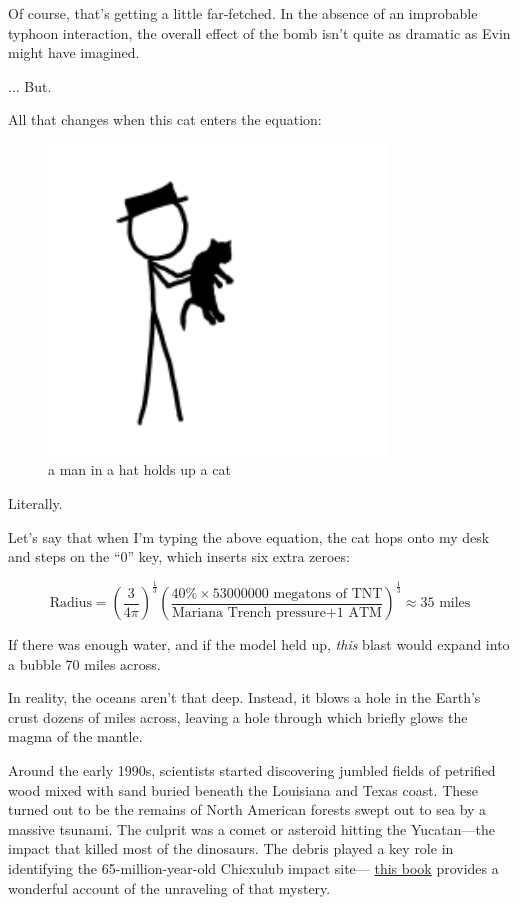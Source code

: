 {Of course, that’s getting a little far-fetched. In the absence of an improbable typhoon interaction, the overall effect of the bomb isn’t quite as dramatic as Evin might have imagined.}

{... But.}

{All that changes when this cat enters the equation:}

\begin{figure}[!htbp]
\centering
\includegraphics[scale=0.5, max width=0.8\textwidth]{imgs/a/15/mariana_cat.png}
\caption{a man in a hat holds up a cat}
\end{figure}

{Literally.}

{Let’s say that when I’m typing the above equation, the cat hops onto my desk and steps on the “0” key, which inserts six extra zeroes:}

{\[\text{Radius} =\left (\frac{3}{4\pi}\right) ^\frac{1}{3}\left (\frac{40\%\times 53000000\text{ megatons of TNT}}{\text{Mariana Trench pressure}+\text{1 ATM}}\right)^\frac{1}{3}\approx35\text{ miles}\]}

{If there was enough water, and if the model held up, \emph{this} blast would expand into a bubble 70 miles across.}

{In reality, the oceans aren’t that deep. Instead, it blows a hole in the Earth’s crust dozens of miles across, leaving a hole through which briefly glows the magma of the mantle.}

{Around the early 1990s, scientists started discovering jumbled fields of petrified wood mixed with sand buried beneath the Louisiana and Texas coast. These turned out to be the remains of North American forests swept out to sea by a massive tsunami. The culprit was a comet or asteroid hitting the Yucatan—the impact that killed most of the dinosaurs. The debris played a key role in identifying the 65-million-year-old Chicxulub impact site— \href{http://www.amazon.com/Crater-Doom-Princeton-Science-Library/dp/0691131031}{this book} provides a wonderful account of the unraveling of that mystery.}

